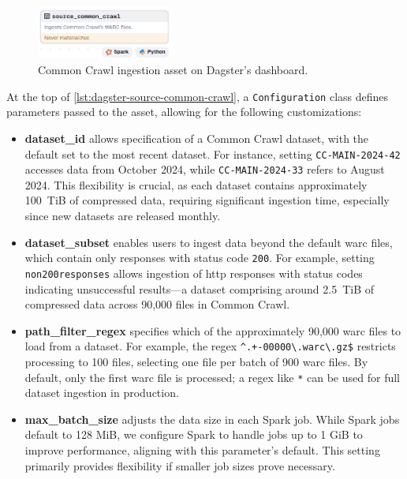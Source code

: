 \begin{figure}[H]
  \centering
  \includegraphics[width=0.4\textwidth]{figures/dagster-common-crawl-source.png}
  \caption{Common Crawl ingestion asset on Dagster's dashboard.}
  \label{fig:dagster-source-common-crawl-source}
\end{figure}

At the top of \cref{lst:dagster-source-common-crawl}, a \texttt{Configuration} class defines parameters passed to the asset, allowing for the following customizations:

\begin{itemize}
    \item \textbf{dataset\_id} allows specification of a Common Crawl dataset, with the default set to the most recent dataset.
        For instance, setting \texttt{CC-MAIN-2024-42} accesses data from October 2024, while \texttt{CC-MAIN-2024-33} refers to August 2024.
        This flexibility is crucial, as each dataset contains approximately 100~TiB of compressed data, requiring significant ingestion time, especially since new datasets are released monthly.
    \item \textbf{dataset\_subset} enables users to ingest data beyond the default \ac{warc} files, which contain only responses with status code \texttt{200}.
        For example, setting \texttt{non200responses} allows ingestion of \ac{http} responses with status codes indicating unsuccessful results—a dataset comprising around 2.5~TiB of compressed data across 90,000 files in Common Crawl.
    \item \textbf{path\_filter\_regex} specifies which of the approximately 90,000 \ac{warc} files to load from a dataset.
        For example, the regex \texttt{\textasciicircum.+-00000\textbackslash.warc\textbackslash.gz\$} restricts processing to 100 files, selecting one file per batch of 900 \ac{warc} files.
        By default, only the first \ac{warc} file is processed; a regex like \texttt{*} can be used for full dataset ingestion in production.
    \item \textbf{max\_batch\_size} adjusts the data size in each Spark job.
        While Spark jobs default to 128 MiB, we configure Spark to handle jobs up to 1 GiB to improve performance, aligning with this parameter's default.
        This setting primarily provides flexibility if smaller job sizes prove necessary.
\end{itemize}

